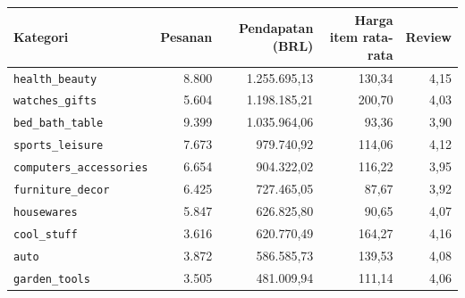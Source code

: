 \begin{tabular}{lrrrr}
\toprule
Kategori & Pesanan & Pendapatan (BRL) & Harga item rata-rata & Review \\
\midrule
\texttt{health\_beauty} & 8.800 & 1.255.695,13 & 130,34 & 4,15 \\
\texttt{watches\_gifts} & 5.604 & 1.198.185,21 & 200,70 & 4,03 \\
\texttt{bed\_bath\_table} & 9.399 & 1.035.964,06 & 93,36 & 3,90 \\
\texttt{sports\_leisure} & 7.673 & 979.740,92 & 114,06 & 4,12 \\
\texttt{computers\_accessories} & 6.654 & 904.322,02 & 116,22 & 3,95 \\
\texttt{furniture\_decor} & 6.425 & 727.465,05 & 87,67 & 3,92 \\
\texttt{housewares} & 5.847 & 626.825,80 & 90,65 & 4,07 \\
\texttt{cool\_stuff} & 3.616 & 620.770,49 & 164,27 & 4,16 \\
\texttt{auto} & 3.872 & 586.585,73 & 139,53 & 4,08 \\
\texttt{garden\_tools} & 3.505 & 481.009,94 & 111,14 & 4,06 \\
\bottomrule
\end{tabular}
